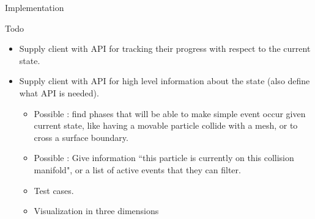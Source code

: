 \documentclass[11pt]{article}
\begin{document}
\begin{section}{Implementation}
\begin{subsection}{Todo}
\begin{itemize}
\item Supply client with API for tracking their progress with respect to the current state. 
\item Supply client with API for high level information about the state (also define what API is needed).
\begin{itemize}
\item Possible : find phases that will be able to make simple event occur given current state, like having a movable particle collide with a mesh, or to cross a surface boundary. 
\item Possible : Give information ``this particle is currently on this collision manifold", or a list of active events that they can filter. 
\item Test cases.
\item Visualization in three dimensions
\end{itemize}
\end{itemize}
\end{subsection}
\end{section}
\end{document}
